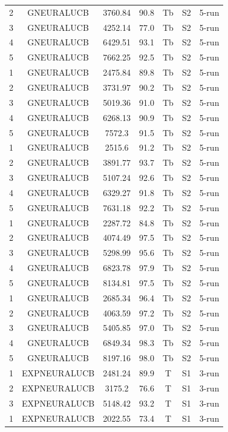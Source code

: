 \documentclass[11pt]{article}
\begin{document}
\begin{center}
\begin{longtable}{|c|c|c|c|c|c|c|}
2 & GNEURALUCB & 3760.84 & 90.8 & Tb & S2 & 5-run \\
3 & GNEURALUCB & 4252.14 & 77.0 & Tb & S2 & 5-run \\
4 & GNEURALUCB & 6429.51 & 93.1 & Tb & S2 & 5-run \\
5 & GNEURALUCB & 7662.25 & 92.5 & Tb & S2 & 5-run \\
1 & GNEURALUCB & 2475.84 & 89.8 & Tb & S2 & 5-run \\
2 & GNEURALUCB & 3731.97 & 90.2 & Tb & S2 & 5-run \\
3 & GNEURALUCB & 5019.36 & 91.0 & Tb & S2 & 5-run \\
4 & GNEURALUCB & 6268.13 & 90.9 & Tb & S2 & 5-run \\
5 & GNEURALUCB & 7572.3 & 91.5 & Tb & S2 & 5-run \\
1 & GNEURALUCB & 2515.6 & 91.2 & Tb & S2 & 5-run \\
2 & GNEURALUCB & 3891.77 & 93.7 & Tb & S2 & 5-run \\
3 & GNEURALUCB & 5107.24 & 92.6 & Tb & S2 & 5-run \\
4 & GNEURALUCB & 6329.27 & 91.8 & Tb & S2 & 5-run \\
5 & GNEURALUCB & 7631.18 & 92.2 & Tb & S2 & 5-run \\
1 & GNEURALUCB & 2287.72 & 84.8 & Tb & S2 & 5-run \\
2 & GNEURALUCB & 4074.49 & 97.5 & Tb & S2 & 5-run \\
3 & GNEURALUCB & 5298.99 & 95.6 & Tb & S2 & 5-run \\
4 & GNEURALUCB & 6823.78 & 97.9 & Tb & S2 & 5-run \\
5 & GNEURALUCB & 8134.81 & 97.5 & Tb & S2 & 5-run \\
1 & GNEURALUCB & 2685.34 & 96.4 & Tb & S2 & 5-run \\
2 & GNEURALUCB & 4063.59 & 97.2 & Tb & S2 & 5-run \\
3 & GNEURALUCB & 5405.85 & 97.0 & Tb & S2 & 5-run \\
4 & GNEURALUCB & 6849.34 & 98.3 & Tb & S2 & 5-run \\
5 & GNEURALUCB & 8197.16 & 98.0 & Tb & S2 & 5-run \\
1 & EXPNEURALUCB & 2481.24 & 89.9 & T & S1 & 3-run \\
2 & EXPNEURALUCB & 3175.2 & 76.6 & T & S1 & 3-run \\
3 & EXPNEURALUCB & 5148.42 & 93.2 & T & S1 & 3-run \\
1 & EXPNEURALUCB & 2022.55 & 73.4 & T & S1 & 3-run \\

\end{longtable}
\end{center}
\end{document}
